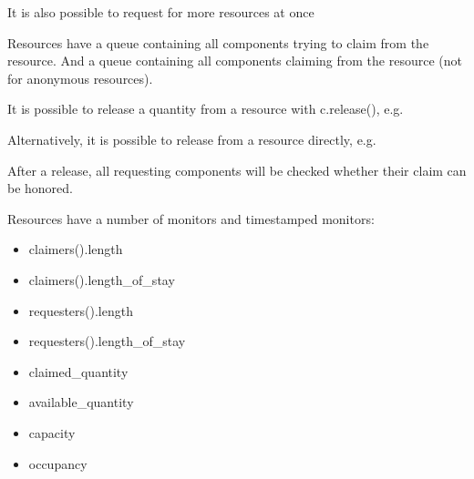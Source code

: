 \documentclass[letterpaper,10pt,english]{sphinxmanual}
\begin{document}
It is also possible to request for more resources at once

\begin{sphinxVerbatim}[commandchars=\\\{\}]
   
\end{sphinxVerbatim}

Resources have a queue  containing all components trying to claim from the resource.
And a queue  containing all components claiming from the resource
(not for anonymous resources).

It is possible to release a quantity from a resource with c.release(), e.g.

\begin{sphinxVerbatim}[commandchars=\\\{\}]
  
  
\end{sphinxVerbatim}

Alternatively, it is possible to release from a resource directly, e.g.

\begin{sphinxVerbatim}[commandchars=\\\{\}]
  
  
\end{sphinxVerbatim}

After a release, all requesting components will be checked whether their claim can be honored.

Resources have a number of monitors and timestamped monitors:
\begin{itemize}
\item {} 
claimers().length

\item {} 
claimers().length\_of\_stay

\item {} 
requesters().length

\item {} 
requesters().length\_of\_stay

\item {} 
claimed\_quantity

\item {} 
available\_quantity

\item {} 
capacity

\item {} 
occupancy

\end{itemize}
\end{document}
